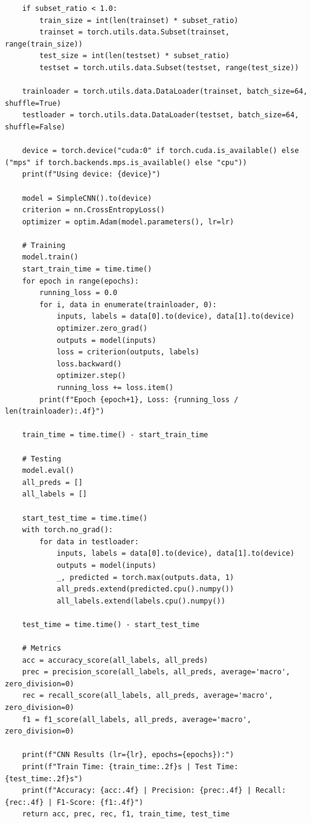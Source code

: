 \documentclass[runningheads]{ctexart}
\begin{document}
\begin{lstlisting}
    if subset_ratio < 1.0:
        train_size = int(len(trainset) * subset_ratio)
        trainset = torch.utils.data.Subset(trainset, range(train_size))
        test_size = int(len(testset) * subset_ratio)
        testset = torch.utils.data.Subset(testset, range(test_size))

    trainloader = torch.utils.data.DataLoader(trainset, batch_size=64, shuffle=True)
    testloader = torch.utils.data.DataLoader(testset, batch_size=64, shuffle=False)

    device = torch.device("cuda:0" if torch.cuda.is_available() else ("mps" if torch.backends.mps.is_available() else "cpu"))
    print(f"Using device: {device}")
    
    model = SimpleCNN().to(device)
    criterion = nn.CrossEntropyLoss()
    optimizer = optim.Adam(model.parameters(), lr=lr)

    # Training
    model.train()
    start_train_time = time.time()
    for epoch in range(epochs):
        running_loss = 0.0
        for i, data in enumerate(trainloader, 0):
            inputs, labels = data[0].to(device), data[1].to(device)
            optimizer.zero_grad()
            outputs = model(inputs)
            loss = criterion(outputs, labels)
            loss.backward()
            optimizer.step()
            running_loss += loss.item()
        print(f"Epoch {epoch+1}, Loss: {running_loss / len(trainloader):.4f}")
    
    train_time = time.time() - start_train_time
    
    # Testing
    model.eval()
    all_preds = []
    all_labels = []
    
    start_test_time = time.time()
    with torch.no_grad():
        for data in testloader:
            inputs, labels = data[0].to(device), data[1].to(device)
            outputs = model(inputs)
            _, predicted = torch.max(outputs.data, 1)
            all_preds.extend(predicted.cpu().numpy())
            all_labels.extend(labels.cpu().numpy())
            
    test_time = time.time() - start_test_time

    # Metrics
    acc = accuracy_score(all_labels, all_preds)
    prec = precision_score(all_labels, all_preds, average='macro', zero_division=0)
    rec = recall_score(all_labels, all_preds, average='macro', zero_division=0)
    f1 = f1_score(all_labels, all_preds, average='macro', zero_division=0)

    print(f"CNN Results (lr={lr}, epochs={epochs}):")
    print(f"Train Time: {train_time:.2f}s | Test Time: {test_time:.2f}s")
    print(f"Accuracy: {acc:.4f} | Precision: {prec:.4f} | Recall: {rec:.4f} | F1-Score: {f1:.4f}")
    return acc, prec, rec, f1, train_time, test_time


\end{lstlisting}
\end{document}

